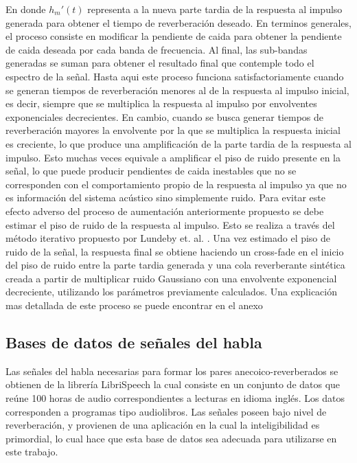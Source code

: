 En donde ${h_{m}}'(t)$ representa a la nueva parte tardia de la respuesta al impulso generada para obtener el tiempo de reverberación deseado. En terminos generales, el proceso consiste en modificar la pendiente de caida para obtener la pendiente de caida deseada por cada banda de frecuencia. Al final, las sub-bandas generadas se suman para obtener el resultado final que contemple todo el espectro de la señal. Hasta aqui este proceso funciona satisfactoriamente cuando se generan tiempos de reverberación menores al de la respuesta al impulso inicial, es decir, siempre que se multiplica la respuesta al impulso por envolventes exponenciales decrecientes. En cambio, cuando se busca generar tiempos de reverberación mayores la envolvente por la que se multiplica la respuesta inicial es creciente, lo que produce una amplificación de la parte tardia de la respuesta al impulso. Esto muchas veces equivale a amplificar el piso de ruido presente en la señal, lo que puede producir pendientes de caida inestables que no se corresponden con el comportamiento propio de la respuesta al impulso ya que no es información del sistema acústico sino simplemente ruido. Para evitar este efecto adverso del proceso de aumentación anteriormente propuesto se debe estimar el piso de ruido de la respuesta al impulso. Esto se realiza a través del método iterativo propuesto por Lundeby et. al. \cite{Lundeby}. Una vez estimado el piso de ruido de la señal, la respuesta final se obtiene haciendo un cross-fade en el inicio del piso de ruido entre la parte tardia generada y una cola reverberante sintética creada a partir de multiplicar ruido Gaussiano con una envolvente exponencial decreciente, utilizando los parámetros previamente calculados. Una explicación mas detallada de este proceso se puede encontrar en el anexo    

\subsection{Bases de datos de señales del habla}

Las señales del habla necesarias para formar los pares anecoico-reverberados se obtienen de la librería LibriSpeech \cite{librispeech} la cual consiste en un conjunto de datos que reúne 100 horas de audio correspondientes a lecturas en idioma inglés. Los datos corresponden a programas tipo audiolibros. Las señales poseen bajo nivel de reverberación, y provienen de una aplicación en la cual la inteligibilidad es primordial, lo cual hace que esta base de datos sea adecuada para utilizarse en este trabajo.

